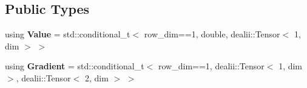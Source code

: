 \subsection*{Public Types}
\begin{DoxyCompactItemize}
\item 
\hypertarget{structSpacy_1_1dealII_1_1Detail_1_1LocalFunGOperatorAssembly_aed415fe17822a49083976eaeec8b0148}{using {\bfseries Value} = std\-::conditional\-\_\-t$<$ row\-\_\-dim==1, double, dealii\-::\-Tensor$<$ 1, dim $>$ $>$}\label{structSpacy_1_1dealII_1_1Detail_1_1LocalFunGOperatorAssembly_aed415fe17822a49083976eaeec8b0148}

\item 
\hypertarget{structSpacy_1_1dealII_1_1Detail_1_1LocalFunGOperatorAssembly_aee9753d776f11914f1aacf7f7b465453}{using {\bfseries Gradient} = std\-::conditional\-\_\-t$<$ row\-\_\-dim==1, dealii\-::\-Tensor$<$ 1, dim $>$, dealii\-::\-Tensor$<$ 2, dim $>$ $>$}\label{structSpacy_1_1dealII_1_1Detail_1_1LocalFunGOperatorAssembly_aee9753d776f11914f1aacf7f7b465453}

\end{DoxyCompactItemize}
